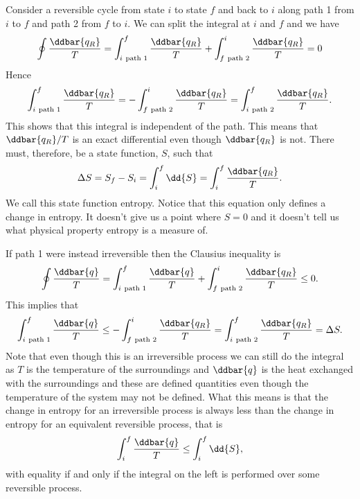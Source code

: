     Consider a reversible cycle from state \(i\) to state \(f\) and back to \(i\) along path 1 from \(i\) to \(f\) and path 2 from \(f\) to \(i\).
    We can split the integral at \(i\) and \(f\) and we have
    \[\oint \frac{\ddbar{q_R}}{T} = \int_{i~\text{path 1}}^{f} \frac{\ddbar{q_R}}{T} + \int_{f~\text{path 2}}^{i} \frac{\ddbar{q_R}}{T} = 0\]
    Hence
    \[\int_{i~\text{path 1}}^{f} \frac{\ddbar{q_R}}{T} = -\int_{f~\text{path 2}}^{i} \frac{\ddbar{q_R}}{T} = \int_{i~\text{path 2}}^{f} \frac{\ddbar{q_R}}{T}.\]
    This shows that this integral is independent of the path.
    This means that \(\ddbar{q_R}/T\) is an exact differential even though \(\ddbar{q_R}\) is not.
    There must, therefore, be a state function, \(S\), such that
    \[\Delta S = S_f - S_i = \int_i^f \dd{S} = \int_i^f \frac{\ddbar{q_R}}{T}.\]
    We call this state function entropy.
    Notice that this equation only defines a change in entropy.
    It doesn't give us a point where \(S = 0\) and it doesn't tell us what physical property entropy is a measure of.
    
    If path 1 were instead irreversible then the Clausius inequality is
    \[\oint \frac{\ddbar{q}}{T} = \int_{i~\text{path 1}}^{f} \frac{\ddbar{q}}{T} + \int_{f~\text{path 2}}^{i} \frac{\ddbar{q_R}}{T} \le 0.\]
    This implies that
    \[\int_{i~\text{path 1}}^{f} \frac{\ddbar{q}}{T} \le -\int_{f~\text{path 2}}^{i} \frac{\ddbar{q_R}}{T} = \int_{i~\text{path 2}}^{f} \frac{\ddbar{q_R}}{T} = \Delta S.\]
    Note that even though this is an irreversible process we can still do the integral as \(T\) is the temperature of the surroundings and \(\ddbar{q}\) is the heat exchanged with the surroundings and these are defined quantities even though the temperature of the system may not be defined.
    What this means is that the change in entropy for an irreversible process is always less than the change in entropy for an equivalent reversible process, that is
    \[\int_i^f\frac{\ddbar{q}}{T} \le \int_i^f \dd{S},\]
    with equality if and only if the integral on the left is performed over some reversible process.
    
